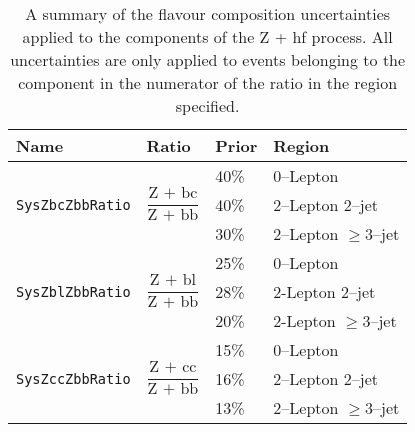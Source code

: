 \begin{table}[!htbp]
  \centering
  \begin{tabular}{llll}
    \toprule
    {\bfseries Name} & {\bfseries Ratio} & {\bfseries Prior} & {\bfseries Region}\\ 
    \midrule
    \multirow{ 3}{*}{\texttt{SysZbcZbbRatio}} & \multirow{ 3}{*}{$\dfrac{\text{Z + bc}}{\text{Z + bb}}$} & 40\% & 0--Lepton \\
                     &								    & 40\% & 2--Lepton 2--jet \\
                     &								    & 30\% & 2--Lepton $\geq$3--jet \\
    \multirow{ 3}{*}{\texttt{SysZblZbbRatio}} & \multirow{ 3}{*}{$\dfrac{\text{Z + bl}}{\text{Z + bb}}$} & 25\% & 0--Lepton \\
                     &								    & 28\% & 2-Lepton 2--jet \\
                     &								    & 20\% & 2-Lepton $\geq$3--jet \\
    \multirow{ 3}{*}{\texttt{SysZccZbbRatio}}    & \multirow{ 3}{*}{$\dfrac{\text{Z + cc}}{\text{Z + bb}}$} & 15\% & 0--Lepton \\
                     &								    &  16\% & 2--Lepton 2--jet \\
                     &								    &   13\% & 2--Lepton $\geq$3--jet \\
    \bottomrule
  \end{tabular}
  \caption{A summary of the flavour composition uncertainties applied to the
    components of the Z + hf process. All uncertainties are only applied to
    events belonging to the component in the numerator of the ratio in the
    region specified.}
  \label{tab:zjets-flavour-comp}
\end{table}